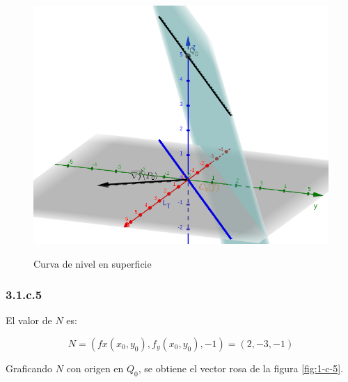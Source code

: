 \documentclass{article}
\begin{document}
\begin{figure}[ht]
\caption{Curva de nivel en superficie}
\includegraphics[scale=0.35]{img/ejercicios/3/1-c-4.png} 
\centering
\label{fig:1-c-4}
\end{figure}

\subsubsection*{3.1.c.5}
\label{subsubsec:3.1.c.5}

El valor de $N$ es:

\begin{equation}
N = (fx(x_0,y_0), f_y(x_0,y_0), -1) = (2, -3, -1)
\end{equation}

Graficando $N$ con origen en $Q_0$, se obtiene el vector rosa de la figura \ref{fig:1-c-5}.
\end{document}

